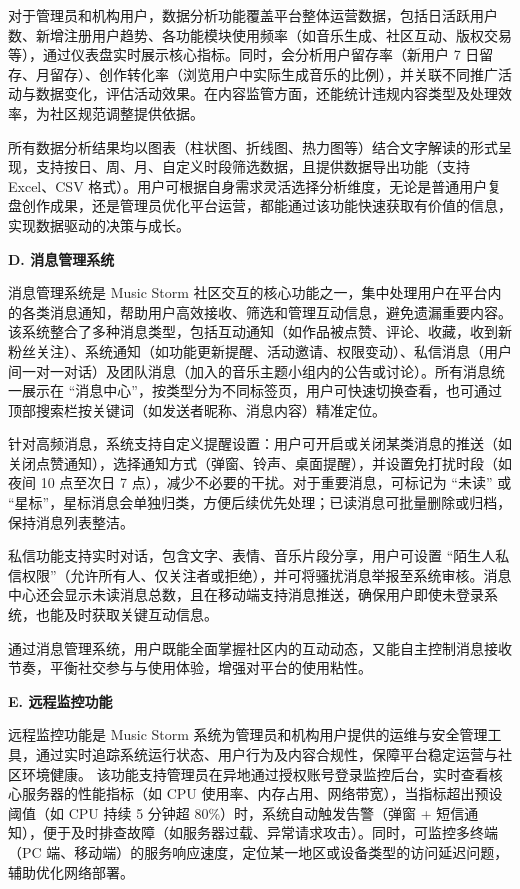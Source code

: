 \documentclass{base}
\numberwithin{figure}{section} %
\begin{document}
对于管理员和机构用户，数据分析功能覆盖平台整体运营数据，包括日活跃用户数、新增注册用户趋势、各功能模块使用频率（如音乐生成、社区互动、版权交易等），通过仪表盘实时展示核心指标。同时，会分析用户留存率（新用户 7 日留存、月留存）、创作转化率（浏览用户中实际生成音乐的比例），并关联不同推广活动与数据变化，评估活动效果。在内容监管方面，还能统计违规内容类型及处理效率，为社区规范调整提供依据。​

所有数据分析结果均以图表（柱状图、折线图、热力图等）结合文字解读的形式呈现，支持按日、周、月、自定义时段筛选数据，且提供数据导出功能（支持 Excel、CSV 格式）。用户可根据自身需求灵活选择分析维度，无论是普通用户复盘创作成果，还是管理员优化平台运营，都能通过该功能快速获取有价值的信息，实现数据驱动的决策与成长。

\textbf{D. 消息管理系统}

消息管理系统是 Music Storm 社区交互的核心功能之一，集中处理用户在平台内的各类消息通知，帮助用户高效接收、筛选和管理互动信息，避免遗漏重要内容。
该系统整合了多种消息类型，包括互动通知（如作品被点赞、评论、收藏，收到新粉丝关注）、系统通知（如功能更新提醒、活动邀请、权限变动）、私信消息（用户间一对一对话）及团队消息（加入的音乐主题小组内的公告或讨论）。所有消息统一展示在 “消息中心”，按类型分为不同标签页，用户可快速切换查看，也可通过顶部搜索栏按关键词（如发送者昵称、消息内容）精准定位。

针对高频消息，系统支持自定义提醒设置：用户可开启或关闭某类消息的推送（如关闭点赞通知），选择通知方式（弹窗、铃声、桌面提醒），并设置免打扰时段（如夜间 10 点至次日 7 点），减少不必要的干扰。对于重要消息，可标记为 “未读” 或 “星标”，星标消息会单独归类，方便后续优先处理；已读消息可批量删除或归档，保持消息列表整洁。

私信功能支持实时对话，包含文字、表情、音乐片段分享，用户可设置 “陌生人私信权限”（允许所有人、仅关注者或拒绝），并可将骚扰消息举报至系统审核。消息中心还会显示未读消息总数，且在移动端支持消息推送，确保用户即使未登录系统，也能及时获取关键互动信息。

通过消息管理系统，用户既能全面掌握社区内的互动动态，又能自主控制消息接收节奏，平衡社交参与与使用体验，增强对平台的使用粘性。

\textbf{E. 远程监控功能}

远程监控功能是 Music Storm 系统为管理员和机构用户提供的运维与安全管理工具，通过实时追踪系统运行状态、用户行为及内容合规性，保障平台稳定运营与社区环境健康。
该功能支持管理员在异地通过授权账号登录监控后台，实时查看核心服务器的性能指标（如 CPU 使用率、内存占用、网络带宽），当指标超出预设阈值（如 CPU 持续 5 分钟超 80\%）时，系统自动触发告警（弹窗 + 短信通知），便于及时排查故障（如服务器过载、异常请求攻击）。同时，可监控多终端（PC 端、移动端）的服务响应速度，定位某一地区或设备类型的访问延迟问题，辅助优化网络部署。​
\end{document}
